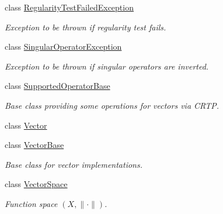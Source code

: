 \begin{DoxyCompactItemize}
class \hyperlink{classSpacy_1_1RegularityTestFailedException}{Regularity\+Test\+Failed\+Exception}
\begin{DoxyCompactList}\small\item\em Exception to be thrown if regularity test fails. \end{DoxyCompactList}\item 
class \hyperlink{classSpacy_1_1SingularOperatorException}{Singular\+Operator\+Exception}
\begin{DoxyCompactList}\small\item\em Exception to be thrown if singular operators are inverted. \end{DoxyCompactList}\item 
class \hyperlink{classSpacy_1_1SupportedOperatorBase}{Supported\+Operator\+Base}
\begin{DoxyCompactList}\small\item\em Base class providing some operations for vectors via C\+R\+T\+P. \end{DoxyCompactList}\item 
class \hyperlink{classSpacy_1_1Vector}{Vector}
\item 
class \hyperlink{classSpacy_1_1VectorBase}{Vector\+Base}
\begin{DoxyCompactList}\small\item\em Base class for vector implementations. \end{DoxyCompactList}\item 
class \hyperlink{classSpacy_1_1VectorSpace}{Vector\+Space}
\begin{DoxyCompactList}\small\item\em Function space $(X,\|\cdot\|)$. \end{DoxyCompactList}\end{DoxyCompactItemize}
